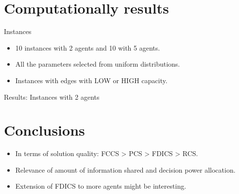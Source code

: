 \documentclass[aspectratio=169]{beamer}
\begin{document}
\section{Computationally results}

\begin{frame}{Instances}
	\begin{itemize}
		\setlength\itemsep{1em}
		\item 10 instances with 2 agents and 10 with 5 agents.
		\item All the parameters selected from uniform distributions.
		\item Instances with edges with LOW or HIGH capacity.
	\end{itemize}
\end{frame}

\begin{frame}{Results: Instances with 2 agents}

\end{frame}




\section{Conclusions}

\begin{frame}{\secname}
\begin{itemize}
\setlength\itemsep{1em}
\item<1-> In terms of solution quality: FCCS > PCS > \alert{FDICS > RCS}.
\item<2-> Relevance of amount of information shared and decision power allocation.
\item<3-> Extension of FDICS to more agents might be interesting.
\end{itemize}
\end{frame}
\end{document}
